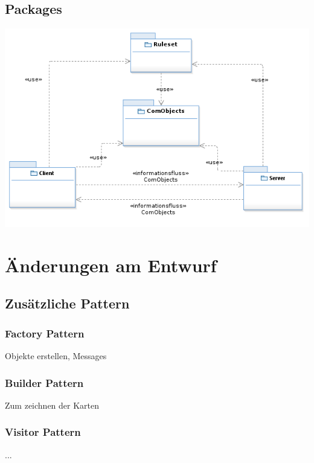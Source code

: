 \documentclass{article}
\begin{document}
\subsection{Packages}
\includegraphics[width=\textwidth]{Packages}
\newpage

\section{Änderungen am Entwurf}
\subsection{Zusätzliche Pattern}
\subsubsection{Factory Pattern}
Objekte erstellen, Messages
\subsubsection{Builder Pattern}
Zum zeichnen der Karten
\subsubsection{Visitor Pattern}
...
\subsection{}
\subsection{}
\subsection{}
\newpage
\end{document}

